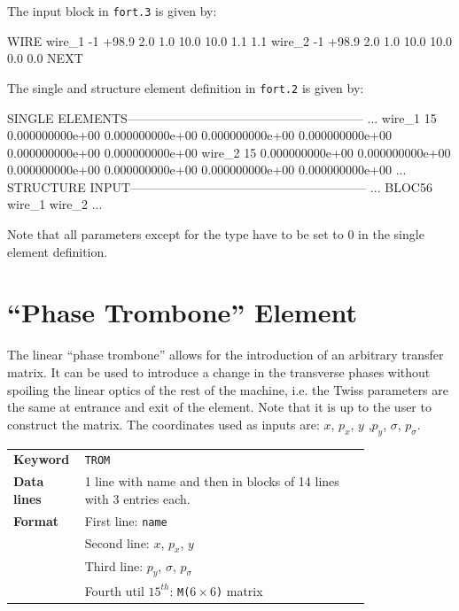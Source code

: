 The input block in \texttt{fort.3} is given by:
\begin{cverbatim}
WIRE
wire_1   -1  +98.9   2.0  1.0   10.0   10.0     1.1     1.1
wire_2   -1  +98.9   2.0  1.0   10.0   10.0     0.0     0.0
NEXT
\end{cverbatim}
The single and structure element definition in \texttt{fort.2} is given by:
\begin{ctverbatim}
SINGLE ELEMENTS---------------------------------------------------------
...
wire_1   15 0.000000000e+00 0.000000000e+00  0.000000000e+00  0.000000000e+00  0.000000000e+00  0.000000000e+00
wire_2   15 0.000000000e+00 0.000000000e+00  0.000000000e+00  0.000000000e+00  0.000000000e+00  0.000000000e+00
...
STRUCTURE INPUT---------------------------------------------------------
...
BLOC56            wire_1              wire_2
...
\end{ctverbatim}
Note that all parameters except for the type have to be set to 0 in the single element definition.

\section{``Phase Trombone'' Element} \label{Trombone}

The linear ``phase trombone'' allows for the introduction of an arbitrary transfer matrix. It can be used to introduce a change in the transverse phases without spoiling the linear optics of the rest of the machine, i.e. the Twiss parameters are the same at entrance and exit of the element. Note that it is up to the user to construct the matrix. The coordinates used as inputs are: $x$, $p_x$, $y$ ,$p_y$, $\sigma$, $p_{\sigma}$.

\bigskip
\begin{tabular}{@{}lp{0.8\linewidth}}
    \textbf{Keyword}    & \texttt{TROM} \\
    \textbf{Data lines} & 1 line with name and then in blocks of 14 lines with 3 entries each. \\
    \textbf{Format}     & First line: \texttt{name} \\
                        & Second line:  $x$, $p_x$, $y$ \\
                        & Third line:  $p_y$, $\sigma$, $p_{\sigma}$ \\
                        & Fourth util $15^{th}$: \texttt{M($ 6 \times 6$)} matrix 
\end{tabular}


